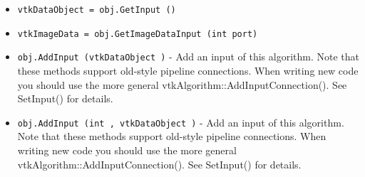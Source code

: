 \begin{itemize}
\item  \verb|vtkDataObject = obj.GetInput ()|

\item  \verb|vtkImageData = obj.GetImageDataInput (int port)|

\item  \verb|obj.AddInput (vtkDataObject )| -  Add an input of this algorithm.  Note that these methods support
 old-style pipeline connections.  When writing new code you should
 use the more general vtkAlgorithm::AddInputConnection().  See
 SetInput() for details.

\item  \verb|obj.AddInput (int , vtkDataObject )| -  Add an input of this algorithm.  Note that these methods support
 old-style pipeline connections.  When writing new code you should
 use the more general vtkAlgorithm::AddInputConnection().  See
 SetInput() for details.

\end{itemize}

